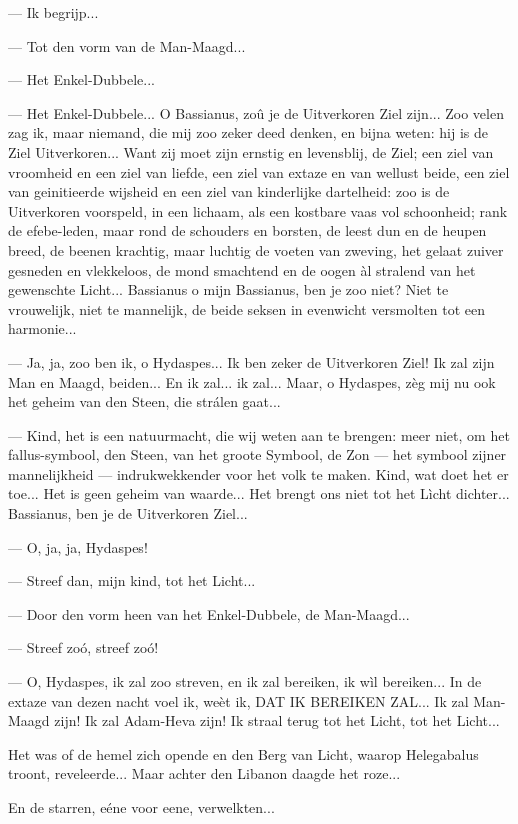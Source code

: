 \documentclass[a4paper, 12pt, oneside, dutch]{article}
\begin{document}
--- Ik begrijp...

--- Tot den vorm van de Man-Maagd...

--- Het Enkel-Dubbele...

--- Het Enkel-Dubbele... O Bassianus, zoû je de Uitverkoren Ziel zijn... Zoo velen zag ik, maar niemand, die mij zoo zeker deed denken, en bijna weten: hij is de Ziel Uitverkoren... Want zij moet zijn ernstig en levensblij, de Ziel; een ziel van vroomheid en een ziel van liefde, een ziel van extaze en van wellust beide, een ziel van geinitieerde wijsheid en een ziel van kinderlijke dartelheid: zoo is de Uitverkoren voorspeld, in een lichaam, als een kostbare vaas vol schoonheid; rank de efebe-leden, maar rond de schouders en borsten, de leest dun en de heupen breed, de beenen krachtig, maar luchtig de voeten van zweving, het gelaat zuiver gesneden en vlekkeloos, de mond smachtend en de oogen àl stralend van het gewenschte Licht... Bassianus o mijn Bassianus, ben je zoo niet? Niet te vrouwelijk, niet te mannelijk, de beide seksen in evenwicht versmolten tot een harmonie...

--- Ja, ja, zoo ben ik, o Hydaspes... Ik ben zeker de Uitverkoren Ziel! Ik zal zijn Man en Maagd, beiden... En ik zal... ik zal... Maar, o Hydaspes, zèg mij nu ook het geheim van den Steen, die strálen gaat...

--- Kind, het is een natuurmacht, die wij weten aan te brengen: meer niet, om het fallus-symbool, den Steen, van het groote Symbool, de Zon --- het symbool zijner mannelijkheid --- indrukwekkender voor het volk te maken. Kind, wat doet het er toe... Het is geen geheim van waarde... Het brengt ons niet tot het Lìcht dichter... Bassianus, ben je de Uitverkoren Ziel...

--- O, ja, ja, Hydaspes!

--- Streef dan, mijn kind, tot het Licht...

--- Door den vorm heen van het Enkel-Dubbele, de Man-Maagd...

--- Streef zoó, streef zoó!

--- O, Hydaspes, ik zal zoo streven, en ik zal bereiken, ik wìl bereiken... In de extaze van dezen nacht voel ik, weèt ik, DAT IK BEREIKEN ZAL... Ik zal Man-Maagd zijn! Ik zal Adam-Heva zijn! Ik straal terug tot het Licht, tot het Licht...

Het was of de hemel zich opende en den Berg van Licht, waarop Helegabalus troont, reveleerde... Maar achter den Libanon daagde het roze...

En de starren, eéne voor eene, verwelkten...
\end{document}
